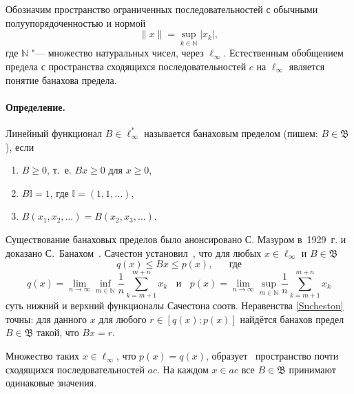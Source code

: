 
\vzmscaption


Обозначим пространство ограниченных последовательностей с обычными полуупорядоченностью и нормой
\begin{equation*}
	\|x\| = \sup_{k\in\mathbb{N}} |x_k|
	,
\end{equation*}
где $\mathbb{N}$ "--- множество натуральных чисел, через $\ell_\infty$.
Естественным обобщением предела с пространства сходящихся последовательностей $c$ на $\ell_\infty$
является понятие банахова предела.


\paragraph{Определение.}
	Линейный функционал $B\in \ell_\infty^*$ называется банаховым пределом
	(пишем: $B \in \mathfrak{B}$),
	если
	\begin{enumerate}
		\item
			$B\geq0$, т.~е. $Bx \geq 0$ для $x \geq 0$,
		\item
			$B\mathbb{I}=1$, где $\mathbb{I} =(1,1,\ldots)$,
		\item
			$B(x_1,x_2,\ldots)=B(x_2,x_3,\ldots)$.
	\end{enumerate}

Существование банаховых пределов было анонсировано С. Мазуром в~1929~г. и доказано С.~Банахом~\cite{banach1993theorie}.
%
Сачестон установил~\cite{sucheston1967banach}, что
для любых $x\in \ell_\infty$ и $B\in\mathfrak{B}$
\begin{equation}\label{Sucheston}
	q(x) \leqslant Bx \leqslant p(x)
	,
	\quad\mbox{~~где}
\end{equation}
\begin{equation*}
	q(x) = \lim_{n\to\infty} \inf_{m\in\mathbb{N}}  \frac{1}{n} \sum_{k=m+1}^{m+n} x_k
	~~~~\mbox{и}~~~~
	p(x) = \lim_{n\to\infty} \sup_{m\in\mathbb{N}}  \frac{1}{n} \sum_{k=m+1}^{m+n} x_k
\end{equation*}
суть нижний и верхний функционалы Сачестона соотв.
Неравенства \eqref{Sucheston} точны:
для данного $x$ для любого $r\in[q(x); p(x)]$ найдётся банахов предел
$B\in\mathfrak{B}$ такой, что $Bx = r$.

Множество таких $x\in\ell_\infty$, что $p(x)=q(x)$,
образует~\cite{lorentz1948contribution} пространство почти сходящихся последовательностей $ac$.
На каждом $x\in ac$ все $B\in \mathfrak{B}$ принимают одинаковые значения.




